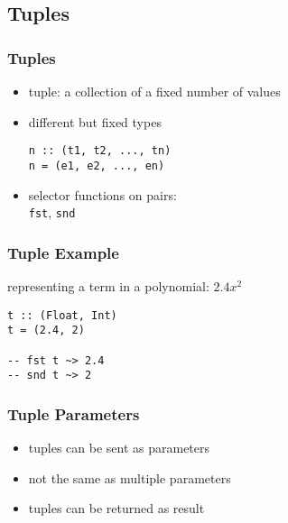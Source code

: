 \documentclass[dvipsnames]{beamer}
\theoremstyle{plain}
\begin{document}
\subsection{Tuples}

\begin{frame}[fragile]
  \frametitle{Tuples}

  \begin{itemize}
    \item \alert{tuple}: a collection of a fixed number of values
    \item different but fixed types

    \smallskip
    \begin{lstlisting}[style=syntax]
n :: (t1, t2, ..., tn)
n = (e1, e2, ..., en)
    \end{lstlisting}

    \medskip
    \item selector functions on pairs:\\
      \lstinline|fst|, \lstinline|snd|
  \end{itemize}
\end{frame}

\begin{frame}[fragile]
  \frametitle{Tuple Example}

  \begin{exampleblock}{representing a term in a polynomial: $2.4x^2$}
    \begin{lstlisting}
t :: (Float, Int)
t = (2.4, 2)

-- fst t ~> 2.4
-- snd t ~> 2
    \end{lstlisting}
  \end{exampleblock}
\end{frame}

\begin{frame}
  \frametitle{Tuple Parameters}

  \begin{itemize}
    \item tuples can be sent as parameters
    \item not the same as multiple parameters

    \bigskip
    \item tuples can be returned as result
  \end{itemize}
\end{frame}
\end{document}

